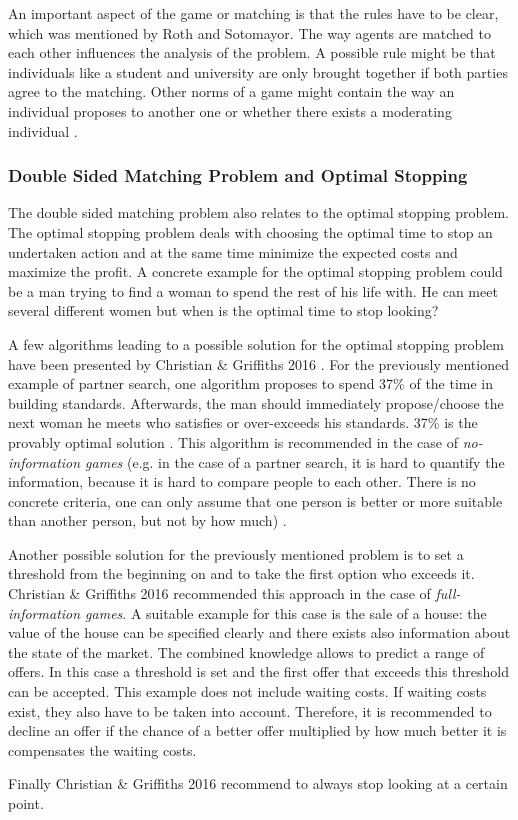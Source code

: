 An important aspect of the game or matching is that the rules have to be clear, which was mentioned by Roth and Sotomayor.
The way agents are matched to each other influences the analysis of the problem.
A possible rule might be that individuals like a student and university are only brought together if both parties agree to the matching.
Other norms of a game might contain the way an individual proposes to another one or whether there exists a moderating individual \cite[p. 492]{roth1992two}.

\clearpage
\subsubsection{Double Sided Matching Problem and Optimal Stopping}
The double sided matching problem also relates to the optimal stopping problem. 
The optimal stopping problem deals with choosing the optimal time to stop an undertaken action and at the same time minimize the expected costs and maximize the profit. 
A concrete example for the optimal stopping problem could be a man trying to find a woman to spend the rest of his life with. 
He can meet several different women but when is the optimal time to stop looking?

A few algorithms leading to a possible solution for the optimal stopping problem have been presented by Christian \& Griffiths 2016 \cite{algtoliveby}. 
For the previously mentioned example of partner search, one algorithm proposes to spend 37\% of the time in building standards. 
Afterwards, the man should immediately propose/choose the next woman he meets who satisfies or over-exceeds his standards.
37\% is the provably optimal solution \cite[p. 2]{algtoliveby}. 
This algorithm is recommended in the case of \textit{no-information games} (e.g. in the case of a partner search, it is hard to quantify the information, because it is hard to compare people to each other. There is no concrete criteria, one can only assume that one person is better or more suitable than another person, but not by how much) \cite[p. 18]{algtoliveby}.

Another possible solution for the previously mentioned problem is to set a threshold from the beginning on and to take the first option who exceeds it. 
Christian \& Griffiths 2016 \cite{algtoliveby} recommended this approach in the case of \textit{full-information games}.
A suitable example for this case is the sale of a house: the value of the house can be specified clearly and there exists also information about the state of the market. 
The combined knowledge allows to predict a range of offers. 
In this case a threshold is set and the first offer that exceeds this threshold can be accepted.
This example does not include waiting costs. 
If waiting costs exist, they also have to be taken into account. 
Therefore, it is recommended to decline an offer if the chance of a better offer multiplied by how much better it is compensates the waiting costs.

Finally Christian \& Griffiths 2016 \cite[pp. 28-30]{algtoliveby} recommend to always stop looking at a certain point.



